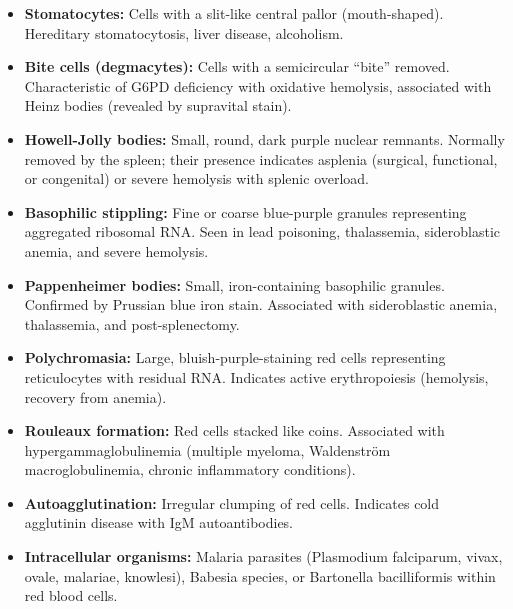 \begin{itemize}
  \item \textbf{Stomatocytes:} Cells with a slit-like central pallor (mouth-shaped). Hereditary stomatocytosis, liver disease, alcoholism.
  \item \textbf{Bite cells (degmacytes):} Cells with a semicircular ``bite'' removed. Characteristic of G6PD deficiency with oxidative hemolysis, associated with Heinz bodies (revealed by supravital stain).
  \item \textbf{Howell-Jolly bodies:} Small, round, dark purple nuclear remnants. Normally removed by the spleen; their presence indicates asplenia (surgical, functional, or congenital) or severe hemolysis with splenic overload.
  \item \textbf{Basophilic stippling:} Fine or coarse blue-purple granules representing aggregated ribosomal RNA. Seen in lead poisoning, thalassemia, sideroblastic anemia, and severe hemolysis.
  \item \textbf{Pappenheimer bodies:} Small, iron-containing basophilic granules. Confirmed by Prussian blue iron stain. Associated with sideroblastic anemia, thalassemia, and post-splenectomy.
  \item \textbf{Polychromasia:} Large, bluish-purple-staining red cells representing reticulocytes with residual RNA. Indicates active erythropoiesis (hemolysis, recovery from anemia).
  \item \textbf{Rouleaux formation:} Red cells stacked like coins. Associated with hypergammaglobulinemia (multiple myeloma, Waldenstr\"{o}m macroglobulinemia, chronic inflammatory conditions).
  \item \textbf{Autoagglutination:} Irregular clumping of red cells. Indicates cold agglutinin disease with IgM autoantibodies.
  \item \textbf{Intracellular organisms:} Malaria parasites (Plasmodium falciparum, vivax, ovale, malariae, knowlesi), Babesia species, or Bartonella bacilliformis within red blood cells.
\end{itemize}

